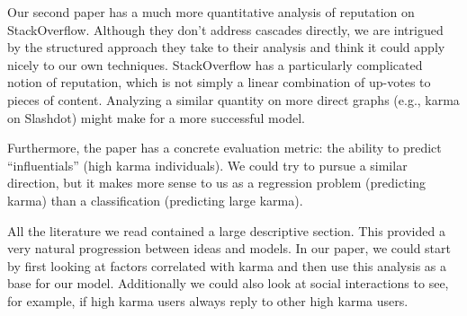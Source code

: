 \documentclass[10pt]{article}
\begin{document}
Our second paper has a much more quantitative analysis of reputation on StackOverflow.
Although they don't address cascades directly, we are intrigued by the structured approach
they take to their analysis and think it could apply nicely to our own techniques.
StackOverflow has a particularly complicated notion of reputation, which is not simply
a linear combination of up-votes to pieces of content. Analyzing a similar quantity
on more direct graphs (e.g., karma on Slashdot) might make for a more successful
model.

Furthermore, the paper has a concrete evaluation metric: the ability to predict 
``influentials'' (high karma individuals). We could try to pursue a similar direction,
but it makes more sense to us as a regression problem (predicting karma) than a classification
(predicting large karma).

All the literature we read contained a large descriptive section. This provided a very
natural progression between ideas and models. In our paper, we could start by first
looking at factors correlated with karma and then use this analysis as a base
for our model. Additionally we could also look at social interactions to see, for example,
if high karma users always reply to other high karma users.





\end{document}
